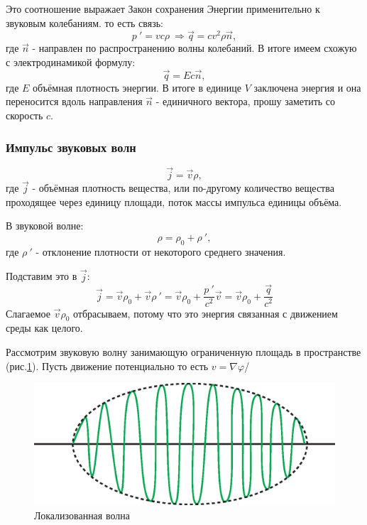\documentclass[14pt,a4paper,oneside]{extarticle}	%
\begin{document}
Это соотношение выражает Закон сохранения Энергии применительно к звуковым колебаниям.
то есть связь:
\begin{equation*}
p\:' = vc \rho\: \Rightarrow \vec{q} = c v^{2} \rho \vec{n},
\end{equation*}
где $ \vec{n} $ - направлен по распространению волны колебаний. В итоге имеем схожую с электродинамикой формулу:
\begin{equation*}
\vec{q} = E c \vec{n},
\end{equation*}
где $ E $ объёмная плотность энергии.
В итоге в единице $ V $ заключена энергия и она переносится вдоль направления $ \vec{n} $ - единичного вектора, прошу заметить  со скорость $ c $.






\subsubsection*{Импульс звуковых волн} %
\begin{equation*}
\vec{j} = \vec{v}\rho ,
\end{equation*}
где $ \vec{j} $ - объёмная плотность вещества, или по-другому количество вещества проходящее через единицу площади, поток массы импульса единицы объёма.

В звуковой волне:
\begin{equation*}
\rho  = \rho_{0} + \rho\:',
\end{equation*}
где $ \rho\:' $ - отклонение плотности от некоторого среднего значения.

Подставим это в $ \vec{j} $:
\begin{equation*}
\vec{j} = \vec{v}\rho_{0}  + \vec{v}\rho \:' = \vec{v}\rho_{0} + \frac{p\:'}{c^{2}}\vec{v} = \vec{v}\rho_{0} + \frac{\vec{q}}{c^{2}}
\end{equation*}
Слагаемое $ \vec{v}\rho_{0} $ отбрасываем, потому что это энергия связанная с движением среды как целого.


Рассмотрим звуковую волну занимающую ограниченную площадь в пространстве (рис.\ref{fig::2}). Пусть движение потенциально то есть $ v = \nabla\varphi $/

\begin{figure}[h!] 	%
	\centering 		%
	\includegraphics[width=12cm]{2.eps} %
	\caption{Локализованная волна}
	\label{fig::2}
\end{figure}
\end{document}
